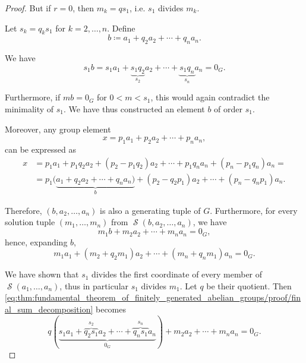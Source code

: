 \begin{proof}
  But if \( r = 0 \), then \( m_k = q s_1 \), i.e. \( s_1 \) divides \( m_k \).

   Let \( s_k = q_k s_1 \) for \( k = 2, \ldots, n \). Define
  \begin{equation*}
    b \coloneqq a_1 + q_2 a_2 + \cdots + q_n a_n.
  \end{equation*}

  We have
  \begin{equation*}
    s_1 b = s_1 a_1 + \underbrace{s_1 q_2}_{s_2} a_2 + \cdots + \underbrace{s_1 q_n}_{s_n} a_n = 0_G.
  \end{equation*}

  Furthermore, if \( mb = 0_G \) for \( 0 < m < s_1 \), this would again contradict the minimality of \( s_1 \). We have thus constructed an element \( b \) of order \( s_1 \).

  Moreover, any group element
  \begin{equation*}
    x = p_1 a_1 + p_2 a_2 + \cdots + p_n a_n,
  \end{equation*}
  can be expressed as
  \begin{align*}
    x
    &=
    p_1 a_1 + p_1 q_2 a_2 + (p_2 - p_1 q_2) a_2 + \cdots + p_1 q_n a_n + (p_n - p_1 q_n) a_n
    = \\ &=
    p_1 (\underbrace{a_1 + q_2 a_2 + \cdots + q_n a_n)}_b + (p_2 - q_2 p_1) a_2 + \cdots + (p_n - q_n p_1) a_n.
  \end{align*}

  Therefore, \( (b, a_2, \ldots, a_n) \) is also a generating tuple of \( G \). Furthermore, for every solution tuple \( (m_1, \ldots, m_n) \) from \( \mscrS(b, a_2, \ldots, a_n) \), we have
  \begin{equation}\label{eq:thm:fundamental_theorem_of_finitely_generated_abelian_groups/proof/final_sum}
    m_1 b + m_2 a_2 + \cdots + m_n a_n = 0_G,
  \end{equation}
  hence, expanding \( b \),
  \begin{equation}\label{eq:thm:fundamental_theorem_of_finitely_generated_abelian_groups/proof/final_sum_decomposition}
    m_1 a_1 + (m_2 + q_2 m_1) a_2 + \cdots + (m_n + q_n m_1) a_n = 0_G.
  \end{equation}

  We have shown that \( s_1 \) divides the first coordinate of every member of \( \mscrS(a_1, \ldots, a_n) \), thus in particular \( s_1 \) divides \( m_1 \). Let \( q \) be their quotient. Then \eqref{eq:thm:fundamental_theorem_of_finitely_generated_abelian_groups/proof/final_sum_decomposition} becomes
  \begin{equation*}
    q(\underbrace{s_1 a_1 + \overbrace{q_2 s_1}^{s_2} a_2 + \cdots + \overbrace{q_n s_1}^{s_n} a_n}_{0_G}) + m_2 a_2 + \cdots + m_n a_n = 0_G.
  \end{equation*}


\end{proof}
